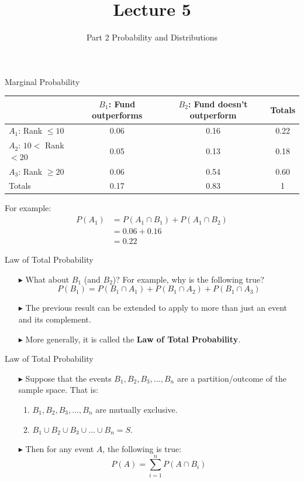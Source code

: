 \documentclass[12pt]{beamer}
\title[ECON2843]{Lecture 5}
\subtitle{Part 2 Probability and Distributions}
\date{}
\begin{document}
	\begin{frame}
		\titlepage
	\end{frame}
\begin{frame}{Marginal Probability}
	\begin{center}
		\begin{tabular}{lccc}
			\toprule
			&\parbox[t]{3cm}{$B_1$: Fund \\outperforms} &\parbox[t]{3cm}{$B_2$: Fund doesn't\\ outperform}&Totals\\
			\hline
			$A_1$: Rank $\le10$&0.06&0.16&0.22\\
			$A_2$: $10<$ Rank $<20$&0.05&0.13&0.18\\
			$A_3$: Rank $\ge20$&0.06&0.54&0.60\\
			\hline
			Totals&0.17&0.83&1\\
			\bottomrule
		\end{tabular}
	\end{center}
	For example:
	\begin{align*}
		P(A_1)&=P(A_1\cap B_1)+P(A_1\cap B_2)\\
		&=0.06+0.16\\
		&=0.22
	\end{align*}
\end{frame}
\begin{frame}{Law of Total Probability}
	
\begin{itemize}
\item[\color{blue}$\blacktriangleright$] What about $B_1$ (and $B_2$)? For example, why is the following true?
$$P(B_1)=P(B_1\cap A_1)+P(B_1\cap A_2)+P(B_1\cap A_3)$$
\item[\color{blue}$\blacktriangleright$] The previous result can be extended to apply to more than just an event and its complement.
\item[\color{blue}$\blacktriangleright$] More generally, it is called the {\bf Law of Total Probability}.
\end{itemize}
\end{frame}
\begin{frame}{Law of Total Probability}
	\begin{itemize}
		\item[\color{blue}$\blacktriangleright$] Suppose that the events $B_1, B_2, B_3,..., B_n$ are a partition/outcome of the sample space. That is:
		\begin{enumerate}[label=\textcolor{blue}{\arabic*.}]
			\item $B_1, B_2, B_3,..., B_n$ are mutually exclusive.
			\item $B_1\cup B_2\cup B_3\cup...\cup B_n=S$.
		\end{enumerate}
		\item[\color{blue}$\blacktriangleright$] Then for any event $A$, the following is true:
		$$P(A)=\sum_{i=1}^nP(A\cap B_i)$$
	\end{itemize}
\end{frame}
\end{document}
